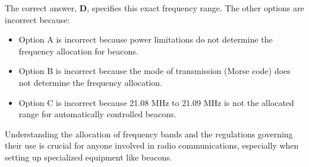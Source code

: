 The correct answer, \textbf{D}, specifies this exact frequency range. The other options are incorrect because:
\begin{itemize}
    \item Option A is incorrect because power limitations do not determine the frequency allocation for beacons.
    \item Option B is incorrect because the mode of transmission (Morse code) does not determine the frequency allocation.
    \item Option C is incorrect because 21.08 MHz to 21.09 MHz is not the allocated range for automatically controlled beacons.
\end{itemize}

Understanding the allocation of frequency bands and the regulations governing their use is crucial for anyone involved in radio communications, especially when setting up specialized equipment like beacons.

